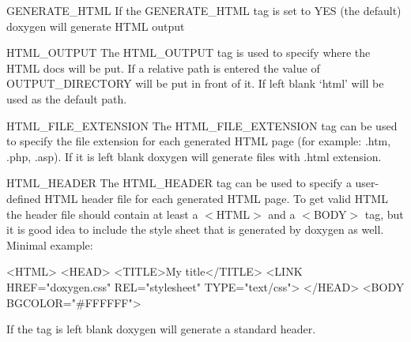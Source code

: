 \begin{DoxyDescription}
\item[{\ttfamily GENERATE\_\-HTML} ] If the {\ttfamily GENERATE\_\-HTML} tag is set to {\ttfamily YES} (the default) doxygen will generate HTML output

\label{config_cfg_html_output}
\hypertarget{config_cfg_html_output}{}
 
\item[{\ttfamily HTML\_\-OUTPUT} ] The {\ttfamily HTML\_\-OUTPUT} tag is used to specify where the HTML docs will be put. If a relative path is entered the value of {\ttfamily OUTPUT\_\-DIRECTORY} will be put in front of it. If left blank `html' will be used as the default path.

\label{config_cfg_html_file_extension}
\hypertarget{config_cfg_html_file_extension}{}
 
\item[{\ttfamily HTML\_\-FILE\_\-EXTENSION} ] The {\ttfamily HTML\_\-FILE\_\-EXTENSION} tag can be used to specify the file extension for each generated HTML page (for example: .htm, .php, .asp). If it is left blank doxygen will generate files with .html extension.

\label{config_cfg_html_header}
\hypertarget{config_cfg_html_header}{}
 
\item[{\ttfamily HTML\_\-HEADER} ] The {\ttfamily HTML\_\-HEADER} tag can be used to specify a user-\/defined HTML header file for each generated HTML page. To get valid HTML the header file should contain at least a {\ttfamily $<$HTML$>$} and a {\ttfamily $<$BODY$>$} tag, but it is good idea to include the style sheet that is generated by doxygen as well. Minimal example: \begin{DoxyVerb}
  <HTML>
    <HEAD>
      <TITLE>My title</TITLE>
      <LINK HREF="doxygen.css" REL="stylesheet" TYPE="text/css">
    </HEAD>
    <BODY BGCOLOR="#FFFFFF">
\end{DoxyVerb}
 If the tag is left blank doxygen will generate a standard header.


\end{DoxyDescription}
